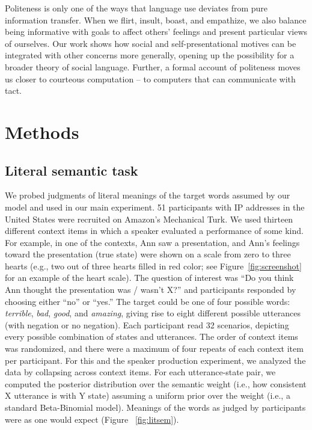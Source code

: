 \documentclass[floatsintext,mask,man]{apa6}
\theoremstyle{definition}
\theoremstyle{definition}
\theoremstyle{definition}
\theoremstyle{remark}
\begin{document}
Politeness is only one of the ways that language use deviates from pure
information transfer. When we flirt, insult, boast, and empathize, we
also balance being informative with goals to affect others' feelings and
present particular views of ourselves. Our work shows how social and
self-presentational motives can be integrated with other concerns more
generally, opening up the possibility for a broader theory of social
language. Further, a formal account of politeness moves us closer to
courteous computation -- to computers that can communicate with tact.

\newpage

\section{Methods}\label{methods}

\subsection{Literal semantic task}\label{literal-semantic-task}

We probed judgments of literal meanings of the target words assumed by
our model and used in our main experiment. 51 participants with IP
addresses in the United States were recruited on Amazon's Mechanical
Turk. We used thirteen different context items in which a speaker
evaluated a performance of some kind. For example, in one of the
contexts, Ann saw a presentation, and Ann's feelings toward the
presentation (true state) were shown on a scale from zero to three
hearts (e.g., two out of three hearts filled in red color; see
Figure~\ref{fig:screenshot} for an example of the heart scale). The
question of interest was \enquote{Do you think Ann thought the
presentation was / wasn't X?} and participants responded by choosing
either \enquote{no} or \enquote{yes.} The target could be one of four
possible words: \emph{terrible}, \emph{bad}, \emph{good}, and
\emph{amazing}, giving rise to eight different possible utterances (with
negation or no negation). Each participant read 32 scenarios, depicting
every possible combination of states and utterances. The order of
context items was randomized, and there were a maximum of four repeats
of each context item per participant. For this and the speaker
production experiment, we analyzed the data by collapsing across context
items. For each utterance-state pair, we computed the posterior
distribution over the semantic weight (i.e., how consistent X utterance
is with Y state) assuming a uniform prior over the weight (i.e., a
standard Beta-Binomial model). Meanings of the words as judged by
participants were as one would expect (Figure ~\ref{fig:litsem}).
\end{document}
